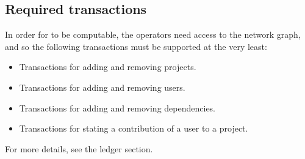 \subsection{Required transactions}

In order for \osrank{} to be computable, the operators need access to the network graph, and so the following transactions must be supported at the very least:
\begin{itemize}
\item Transactions for adding and removing projects.
\item Transactions for adding and removing users.
\item Transactions for adding and removing dependencies.
\item Transactions for stating a contribution of a user to a project.
\end{itemize}
For more details, see the ledger section. %
